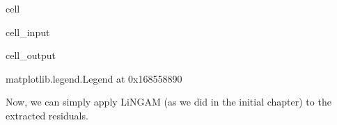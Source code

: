 \documentclass[letterpaper,10pt,english]{jupyterBook}
\begin{document}
\begin{sphinxuseclass}{cell}\begin{sphinxVerbatimInput}

\begin{sphinxuseclass}{cell_input}
\begin{sphinxVerbatim}[commandchars=\\\{\}]
   \PYG{p}{[}\PYG{p}{]}
     \PYG{p}{[} \PYG{p}{]} \PYG{p}{[}\PYG{p}{]}
\end{sphinxVerbatim}

\end{sphinxuseclass}\end{sphinxVerbatimInput}
\begin{sphinxVerbatimOutput}

\begin{sphinxuseclass}{cell_output}
\begin{sphinxVerbatim}[commandchars=\\\{\}]
\PYGZlt{}matplotlib.legend.Legend at 0x168558890\PYGZgt{}
\end{sphinxVerbatim}

\noindent{}

\end{sphinxuseclass}\end{sphinxVerbatimOutput}

\end{sphinxuseclass}
\sphinxAtStartPar
Now, we can simply apply LiNGAM (as we did in the initial chapter) to the extracted residuals.
\end{document}
